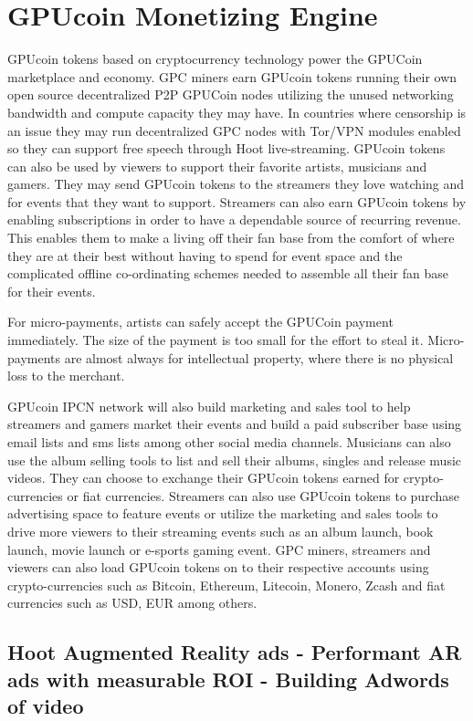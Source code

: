 \documentclass{article}
\begin{document}
\section{GPUcoin Monetizing Engine}
GPUcoin tokens based on cryptocurrency technology power the GPUCoin marketplace and economy. GPC miners earn GPUcoin tokens running their own open source decentralized P2P GPUCoin nodes utilizing the unused networking bandwidth and compute capacity they may have. In countries where censorship is an issue they may run decentralized GPC nodes with Tor/VPN modules enabled so they can support free speech through Hoot live-streaming. GPUcoin tokens can also be used by viewers to support their favorite artists, musicians and gamers. They may send GPUcoin tokens to the streamers they love watching and for events that they want to support. Streamers can also earn GPUcoin tokens by enabling subscriptions in order to have a dependable source of recurring revenue. This enables them to make a living off their fan base from the comfort of where they are at their best without having to spend for event space and the complicated offline co-ordinating schemes needed to assemble all their fan base for their events.

For micro-payments, artists can safely accept the GPUCoin payment immediately. The size of the payment is too small for the effort to steal it. Micro-payments are almost always for intellectual property, where there is no physical loss to the merchant.

 GPUcoin IPCN network will also build marketing and sales tool to help streamers and gamers market their events and build a paid subscriber base using email lists and sms lists among other social media channels. 
Musicians can also use the album selling tools to list and sell their albums, singles and release music videos. They can choose to exchange their GPUcoin tokens earned for crypto-currencies or fiat currencies.
 Streamers can also use GPUcoin tokens to purchase advertising space to feature events or utilize the marketing and sales tools to drive more viewers to their streaming events such as an album launch, book launch, movie launch or e-sports gaming event. GPC miners, streamers and viewers can also load GPUcoin tokens on to their respective accounts using crypto-currencies such as Bitcoin, Ethereum, Litecoin, Monero, Zcash and fiat currencies such as USD, EUR among others.

\subsection{Hoot Augmented Reality ads - Performant AR ads with measurable ROI - Building Adwords of video }
\end{document}
